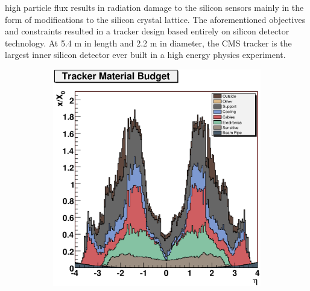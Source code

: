high particle flux results in radiation damage to the silicon sensors mainly 
in the form of modifications to the silicon crystal lattice. 
The aforementioned objectives and constraints resulted in a tracker design 
based entirely on silicon detector technology. 
At 5.4 m in length and 2.2 m in diameter, the CMS tracker is the largest inner
silicon detector ever built in a high energy physics experiment.
\begin{figure}[hb]
  \centering
  \begin{subfigure}[b]{.45\textwidth}
	\includegraphics[width=\textwidth]{images/Tracker_Materials_x_vs_eta.eps} 
	\end{subfigure}	
   \begin{subfigure}[b]{.45\textwidth}

\end{subfigure}
\end{figure}
